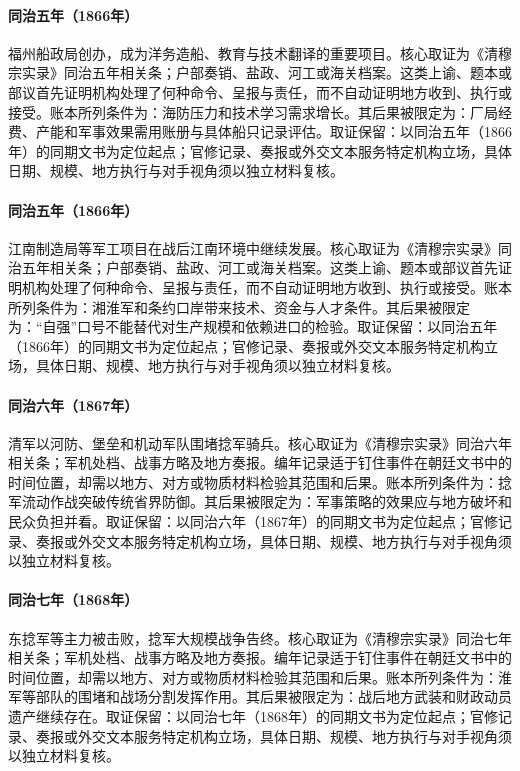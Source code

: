 \hypertarget{ledger:EQ-1866-FUJIAN-SHIPYARD}{}\paragraph{同治五年（1866年）}福州船政局创办，成为洋务造船、教育与技术翻译的重要项目。核心取证为《清穆宗实录》同治五年相关条；户部奏销、盐政、河工或海关档案。这类上谕、题本或部议首先证明机构处理了何种命令、呈报与责任，而不自动证明地方收到、执行或接受。账本所列条件为：海防压力和技术学习需求增长。其后果被限定为：厂局经费、产能和军事效果需用账册与具体船只记录评估。取证保留：以同治五年（1866年）的同期文书为定位起点；官修记录、奏报或外交文本服务特定机构立场，具体日期、规模、地方执行与对手视角须以独立材料复核。
\hypertarget{ledger:EQ-1866-NINGBO-SHANGHAI-INDUSTRY}{}\paragraph{同治五年（1866年）}江南制造局等军工项目在战后江南环境中继续发展。核心取证为《清穆宗实录》同治五年相关条；户部奏销、盐政、河工或海关档案。这类上谕、题本或部议首先证明机构处理了何种命令、呈报与责任，而不自动证明地方收到、执行或接受。账本所列条件为：湘淮军和条约口岸带来技术、资金与人才条件。其后果被限定为：“自强”口号不能替代对生产规模和依赖进口的检验。取证保留：以同治五年（1866年）的同期文书为定位起点；官修记录、奏报或外交文本服务特定机构立场，具体日期、规模、地方执行与对手视角须以独立材料复核。
\hypertarget{ledger:EQ-1867-NIAN-CAVALRY-CAMPAIGN}{}\paragraph{同治六年（1867年）}清军以河防、堡垒和机动军队围堵捻军骑兵。核心取证为《清穆宗实录》同治六年相关条；军机处档、战事方略及地方奏报。编年记录适于钉住事件在朝廷文书中的时间位置，却需以地方、对方或物质材料检验其范围和后果。账本所列条件为：捻军流动作战突破传统省界防御。其后果被限定为：军事策略的效果应与地方破坏和民众负担并看。取证保留：以同治六年（1867年）的同期文书为定位起点；官修记录、奏报或外交文本服务特定机构立场，具体日期、规模、地方执行与对手视角须以独立材料复核。
\hypertarget{ledger:EQ-1868-NIAN-SUPPRESSION}{}\paragraph{同治七年（1868年）}东捻军等主力被击败，捻军大规模战争告终。核心取证为《清穆宗实录》同治七年相关条；军机处档、战事方略及地方奏报。编年记录适于钉住事件在朝廷文书中的时间位置，却需以地方、对方或物质材料检验其范围和后果。账本所列条件为：淮军等部队的围堵和战场分割发挥作用。其后果被限定为：战后地方武装和财政动员遗产继续存在。取证保留：以同治七年（1868年）的同期文书为定位起点；官修记录、奏报或外交文本服务特定机构立场，具体日期、规模、地方执行与对手视角须以独立材料复核。
